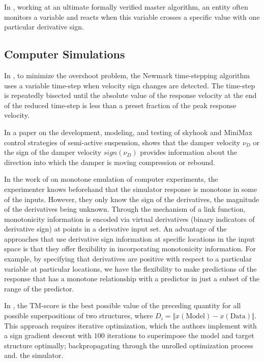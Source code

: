 \documentclass[11pt]{book}
\begin{document}
In \cite{deantoni2018towards}, working at an ultimate formally verified master algorithm, an entity often monitors a variable
and reacts when this variable crosses a specific value with one particular
derivative sign.


\subsection{Computer Simulations}

In \cite{sjoberg2003probabilistic}, to minimize the overshoot problem,
the Newmark time-stepping algorithm uses a variable time-step when
velocity sign changes are detected. The time-step is repeatedly bisected
until the absolute value of the response velocity at the end of the
reduced time-step is less than a preset fraction of the peak response
velocity.

In a paper on the development, modeling, and testing of skyhook and MiniMax
control strategies of semi-active suspension, \cite{zhang2009comparison} shows that the damper velocity $\nu_{D}$ or
the sign of the damper velocity $sign(\nu_{D})$ provides information
about the direction into which the damper is moving compression or
rebound.

In the work of \cite{golchi2015monotone} on monotone emulation of computer experiments, the experimenter knows
beforehand that the simulator response is monotone in some of the
inputs. However, they only know the sign of the derivatives, the magnitude
of the derivatives being unknown. Through the mechanism of a link
function, monotonicity information is encoded via virtual derivatives
(binary indicators of derivative sign) at points in a derivative input
set. An advantage of the approaches that use derivative sign information
at specific locations in the input space is that they offer flexibility
in incorporating monotonicity information. For example, by specifying
that derivatives are positive with respect to a particular variable
at particular locations, we have the flexibility to make predictions
of the response that has a monotone relationship with a predictor
in just a subset of the range of the predictor.

In \cite{ingraham2018learning}, the TM-score is the best possible
value of the preceding quantity for all possible superpositions of
two structures, where $D_{i}=\Vert x\left(\text{Model}\right)-x\left(\text{Data}\right)\Vert$.
This approach requires iterative optimization, which the authors implement
with a sign gradient descent with $100$ iterations to superimpose
the model and target structure optimally; backpropagating through
the unrolled optimization process and. the simulator.
\end{document}
